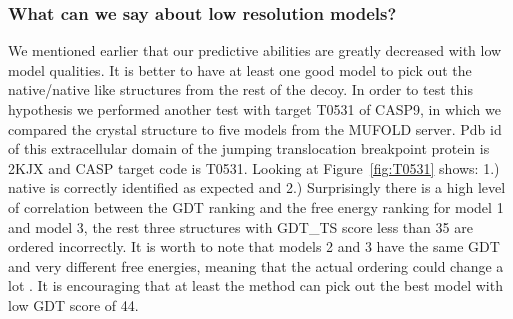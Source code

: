 \documentclass[12pt]{article}
\begin{document}
\subsubsection{What can we say about low resolution models?}

We mentioned earlier that our predictive abilities are greatly decreased with low model qualities. It is
better to have at least one good model to pick out the native/native like structures from the rest of the decoy. 
In order to test this hypothesis we performed another test with target T0531 of CASP9, in which we compared the crystal 
structure to five models from the MUFOLD server. Pdb id of this extracellular domain of the jumping translocation 
breakpoint protein is 2KJX and CASP target code is T0531.
Looking at Figure~\ref{fig:T0531} shows: 1.) native is correctly
identified as expected and 2.) Surprisingly there is a high level of correlation between the GDT
ranking and the free energy ranking for model 1 and model 3, the rest three structures with GDT\_TS score less than  35  are ordered
incorrectly. It is worth to note that models 2 and 3 have the same GDT and very different free
energies, meaning that the actual ordering could change a lot \cite{Perez2012}. It is encouraging that at least
the method can pick out the best model with low GDT score of 44.  


\end{document}
